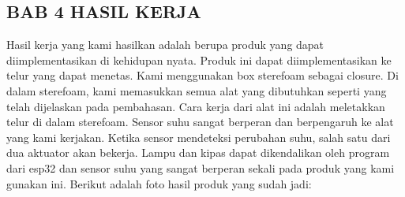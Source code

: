 \begin{center}
    \section*{BAB 4 HASIL KERJA}
\end{center}

\setcounter{section}{4}
\setcounter{subsection}{0}

    Hasil kerja yang kami hasilkan adalah berupa produk yang dapat diimplementasikan di kehidupan nyata. Produk ini dapat diimplementasikan ke telur yang dapat menetas. Kami menggunakan box sterefoam sebagai closure. Di dalam sterefoam, kami memasukkan semua alat yang dibutuhkan seperti yang telah dijelaskan pada pembahasan. Cara kerja dari alat ini adalah meletakkan telur di dalam sterefoam. Sensor suhu sangat berperan dan berpengaruh ke alat yang kami kerjakan. Ketika sensor mendeteksi perubahan suhu, salah satu dari dua aktuator akan bekerja. Lampu dan kipas dapat dikendalikan oleh program dari esp32 dan sensor suhu yang sangat berperan sekali pada produk yang kami gunakan ini. Berikut adalah foto hasil produk yang sudah jadi:

